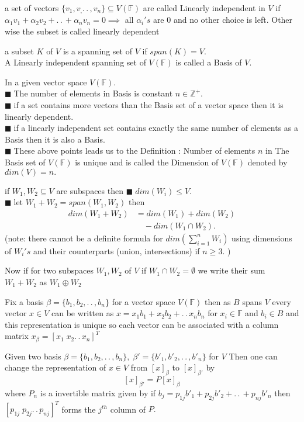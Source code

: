 \documentclass[11pt]{extarticle}
\newcommand{\Z}{\mathbb{Z}}
\newcommand{\F}{\mathbb{F}}
\newcommand{\ck}{.\,.\,}
\newcommand{\snote}[1]{{\footnotesize(#1)}}
\newcommand{\tbx}[2][]{
	\begin{tcolorbox}[enhanced,breakable,size=small,colback=black!2!white,title={#1},arc is angular, arc=1.5mm,drop fuzzy shadow]
		#2
	\end{tcolorbox}
}
\newcommand{\y}{$\blacksquare\;$}
\newcommand{\yi}{\\$\blacksquare\;$}
\begin{document}
\begin{multicols}{2}
	\tbx[Dependence]{ a set of vectors $ \{v_1,v_,\ck, v_n\} \subseteq V(\F)$ are called Linearly independent in $ V $ if $ \alpha_1v_1+\alpha_2v_2+\ck+\alpha_nv_n=0 \implies $ all $ \alpha_i's$ are $ 0 $ and no other choice is left. Other wise the subset is called linearly dependent}
	\tbx[Basis]{  a subset $ K $ of $ V $ is a spanning set of $ V $ if $ span(K)=V.$\\
	A Linearly independent spanning set of $ V(\F) $ is called a Basis of $ V. $ 
	}
	\tbx[Dimension]{ In a given vector space $ V(\F) .$
	\yi The number of elements in Basis is constant $ n\in \Z^+. $ 
	\yi if a set contains more vectors than the Basis set of a vector space then it is linearly dependent.
	\yi if a linearly independent set contains exactly the same number of elements as a Basis then it is also a Basis.
	\yi These above points leads us to the Definition : Number of elements $ n $  in The Basis set of $ V(\F) $ is unique and is called the Dimension of $ V(\F)$ denoted by $ dim(V)=n. $ }
	\tbx{ if $ W_1,W_2\subseteq V $ are subspaces then 
	\y $ dim(W_i) \leq V.$ 
	\yi let $ W_1+W_2=span(W_1,W_2) $ then 
	\begin{align*}
		dim(W_1+W_2) &= dim(W_1)+dim(W_2)\\
		& \quad -dim(W_1\cap W_2).
	\end{align*}
	\snote{note: there cannot be a definite formula for $ dim(\sum_{i=1}^{n}W_i) $ using dimensions of $ W_i's $ and their counterparts (union, intersections) if $ n\geq 3 $. }}
	\tbx[Direct sum]{ Now if for two subspaces $ W_1,W_2 $ of $V $ if $ W_1\cap W_2=\emptyset $ we write their sum $ W_1+W_2 $ as $ W_1\oplus W_2 $   }
	\tbx[Matrix Representation of vectors]{ Fix a basis $ \beta=\{b_1,b_2,\ck, b_n\} $ for a vector space $ V(\F) $ then as $ B $ spans $ V $  every vector  $x \in  V $ can be written as $ x=x_1b_1+x_2b_2+\ck x_nb_n $ for $ x_i\in \F $ and $ b_i\in B $ and this representation is unique so each vector can be associated with a column matrix $ x_\beta=[x_1\; x_2\ck x_n]^T $ }
	\tbx[Change of Basis Matrix]{  Given two basis $ \beta= \{b_1,b_2,\ck, b_n\}, \; \beta' =\{b'_1,b'_2,\ck, b'_n\} $ for $ V $ Then one can change the representation of $ x\in V $ from $ [x]_\beta $ to $ [x]_{\beta'} $ by 
	\[[x]_{\beta'}=P[x]_\beta\] where $ P_n $ is a invertible matrix given by if $ b_j=p_{1j}b'_1+p_{2j}b'_2+\ck +p_{nj}b'_n$ then $ [p_{1j}\; p_{2j} \ck p_{nj}]^T $ forms the $ j^{th} $ column of $ P. $}

\end{multicols}
\end{document}
